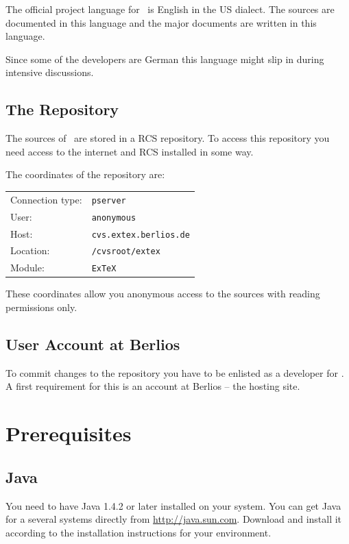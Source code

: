 \documentclass{extex-doc}
\begin{document}
The official project language for \ExTeX\ is English in the US
dialect. The sources are documented in this language and the major
documents are written in this language.

Since some of the developers are German this language might slip in
during intensive discussions.

\section{The Repository}

The sources of \ExTeX\ are stored in a RCS repository. To access this
repository you need access to the internet and RCS installed in some
way.

The coordinates of the repository are:\medskip

\begin{tabular}{ll}\toprule
  Connection type: & \texttt{pserver}			\\
  User:		   & \texttt{anonymous}			\\
  Host:		   & \texttt{cvs.extex.berlios.de}	\\
  Location:	   & \texttt{/cvsroot/extex}		\\
  Module:	   & \texttt{ExTeX}			\\\bottomrule
\end{tabular}\medskip

These coordinates allow you anonymous access to the sources with
reading permissions only.

\section{User Account at Berlios}

To commit changes to the repository you have to be enlisted as a
developer for \ExTeX. A first requirement for this is an account at
Berlios -- the hosting site. 



\chapter{Prerequisites}

\section{Java}

You need to have Java 1.4.2 or later installed on your system. You can
get Java for a several systems directly from \url{http://java.sun.com}.
Download and install it according to the installation instructions for
your environment.
\end{document}
